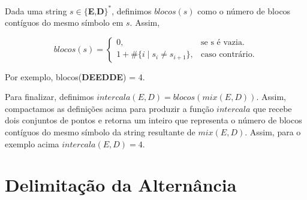 Dada uma string $s \in \{$\textbf{E},\textbf{D}$\}^{*}$, definimos $blocos(s)$ como o número de blocos contíguos do mesmo símbolo em $s$. Assim,

\[
blocos(s) = 
\begin{cases}
    0, & \text{se s é vazia}. \\
    1 + \#\{i \mid s_i \neq s_{i+1}\}, & \text{caso contrário}.
\end{cases}
\]

Por exemplo, blocos(\textbf{DEEDDE}) = 4.

Para finalizar, definimos $intercala(E,D) = blocos(mix(E,D))$. Assim, compactamos as definições acima para produzir a função $intercala$ que recebe dois conjuntos de pontos e retorna um inteiro que representa o número de blocos contíguos do mesmo símbolo da string resultante de $mix(E,D)$. Assim, para o exemplo acima $intercala(E,D) = 4$.


\section{Delimitação da Alternância}


